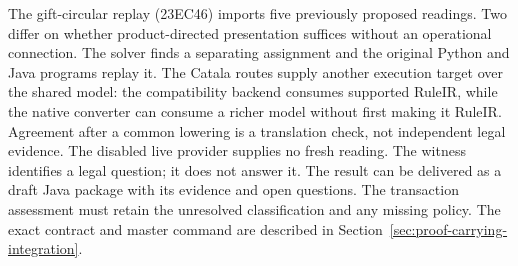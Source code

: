 \begin{MapDiagram}
\end{MapDiagram}

The gift-circular replay (23EC46) imports five previously proposed readings. Two differ
on whether product-directed presentation suffices without an operational
connection. The solver finds a separating assignment and the original Python
and Java programs replay it. The Catala routes supply another execution target
over the shared model: the compatibility backend consumes supported RuleIR,
while the native converter can consume a richer model without first making it
RuleIR. Agreement after a common lowering is a translation check, not
independent legal evidence. The disabled live provider supplies no fresh
reading. The witness identifies a legal question; it does not answer it.
The result can be delivered
as a draft Java package with its evidence and open questions. The transaction
assessment must retain the unresolved classification and any missing policy.
The exact contract and master command are described in
Section~\ref{sec:proof-carrying-integration}.

